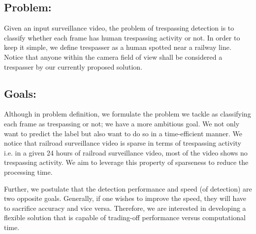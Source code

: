 \subsection{Problem:} Given an input surveillance video, the problem of trespassing detection is to classify whether each frame has human trespassing activity or not. In order to
keep it simple, we define trespasser as a human spotted near a railway line. Notice that anyone within the camera field of view shall be considered a trespasser by our currently proposed solution.
\subsection{Goals:} Although in problem definition, we formulate the problem we tackle as classifying each frame as trespassing or not; we have a more ambitious goal. We not only want to predict the label but also want to do so in a time-efficient manner. We notice that railroad surveillance video is sparse in terms of trespassing activity i.e. in a given 24 hours of railroad surveillance video, most of the video shows no trespassing activity. We aim to leverage this property of sparseness to reduce the processing time. 

Further, we postulate that the detection performance and speed (of detection) are two opposite goals. Generally, if one wishes to improve the speed, they will have to sacrifice accuracy and vice versa. Therefore, we are interested in developing a  flexible solution that is capable of trading-off performance versus computational time.